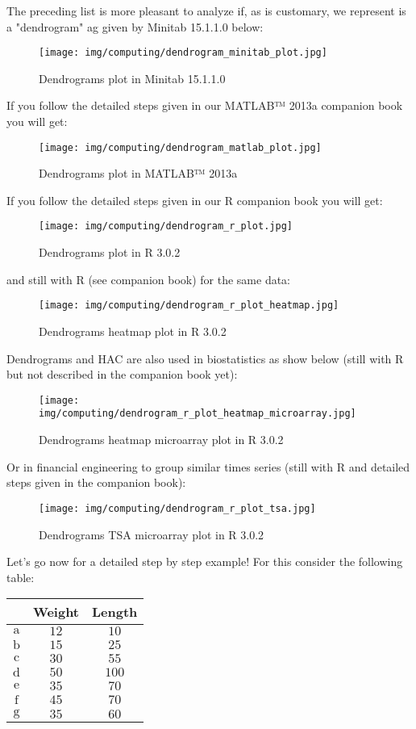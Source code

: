 	The preceding list is more pleasant to analyze if, as is customary, we represent is a "dendrogram" ag given by Minitab 15.1.1.0 below:	
	\begin{figure}[H]
		\centering
		\texttt{[image: img/computing/dendrogram\_minitab\_plot.jpg]}
		\caption{Dendrograms plot in Minitab 15.1.1.0}
	\end{figure}
	If you follow the detailed steps given in our MATLAB™ 2013a companion book you will get:
	\begin{figure}[H]
		\centering
		\texttt{[image: img/computing/dendrogram\_matlab\_plot.jpg]}
		\caption{Dendrograms plot in MATLAB™ 2013a }
	\end{figure}
	If you follow the detailed steps given in our R companion book you will get:
	\begin{figure}[H]
		\centering
		\texttt{[image: img/computing/dendrogram\_r\_plot.jpg]}
		\caption{Dendrograms plot in R 3.0.2}
	\end{figure}
	and still with R (see companion book) for the same data:
	\begin{figure}[H]
		\centering
		\texttt{[image: img/computing/dendrogram\_r\_plot\_heatmap.jpg]}
		\caption{Dendrograms heatmap plot in R 3.0.2}
	\end{figure}
	Dendrograms and HAC are also used in biostatistics as show below (still with R but not described in the companion book yet):
	\begin{figure}[H]
		\centering
		\texttt{[image: img/computing/dendrogram\_r\_plot\_heatmap\_microarray.jpg]}
		\caption{Dendrograms heatmap microarray plot in R 3.0.2}
	\end{figure}
	Or in financial engineering to group similar times series (still with R and detailed steps given in the companion book):
	\begin{figure}[H]
		\centering
		\texttt{[image: img/computing/dendrogram\_r\_plot\_tsa.jpg]}
		\caption{Dendrograms TSA microarray plot in R 3.0.2}
	\end{figure}
	Let's go now for a detailed step by step example! For this consider the following table:
	\begin{table}[H]
		\centering
		\begin{tabular}{|c|c|c|}
		\hline
		\rowcolor[HTML]{9B9B9B} 
		\multicolumn{1}{|l|}{\cellcolor[HTML]{9B9B9B}\textbf{Object}} & \multicolumn{1}{l|}{\cellcolor[HTML]{9B9B9B}\textbf{Weight}} & \multicolumn{1}{l|}{\cellcolor[HTML]{9B9B9B}\textbf{Length}} \\ \hline
		$\mathrm{a}$ & $12$ & $10$ \\ \hline
		$\mathrm{b}$ & $15$ & $25$ \\ \hline
		$\mathrm{c}$ & $30$ & $55$ \\ \hline
		$\mathrm{d}$ & $50$ & $100$ \\ \hline
		$\mathrm{e}$ & $35$ & $70$ \\ \hline
		$\mathrm{f}$ & $45$ & $70$ \\ \hline
		$\mathrm{g}$ & $35$ & $60$ \\ \hline
		\end{tabular}
	\end{table}
